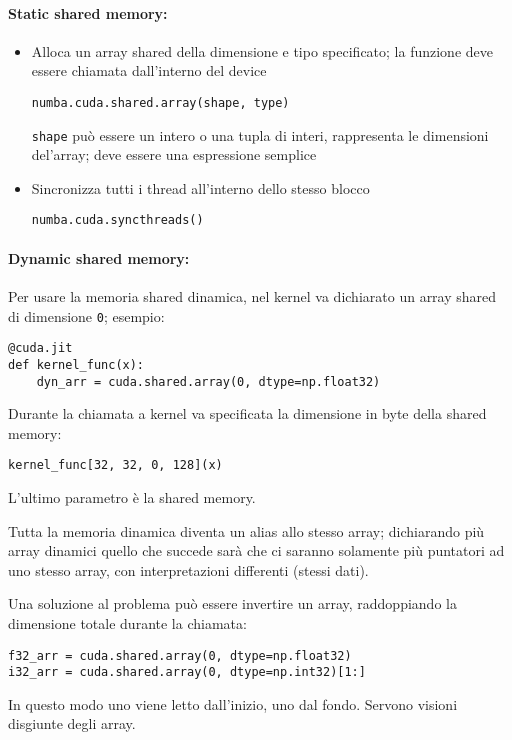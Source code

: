 \paragraph{Static shared memory:}
\begin{itemize}
	\item Alloca un array shared della dimensione e tipo specificato; la funzione deve essere chiamata dall'interno del device
	\begin{verbatim}
numba.cuda.shared.array(shape, type)
	\end{verbatim}
	\texttt{shape} può essere un intero o una tupla di interi, rappresenta le dimensioni del'array; deve essere una espressione semplice
	
	\item Sincronizza tutti i thread all'interno dello stesso blocco
	\begin{verbatim}
numba.cuda.syncthreads()
	\end{verbatim}
\end{itemize} 

\paragraph{Dynamic shared memory:} Per usare la memoria shared dinamica, nel kernel va dichiarato un array shared di dimensione \texttt{0}; esempio:
\begin{verbatim}
@cuda.jit
def kernel_func(x):
	dyn_arr = cuda.shared.array(0, dtype=np.float32)
\end{verbatim}

Durante la chiamata a kernel va specificata la dimensione in byte della shared memory:
\begin{verbatim}
kernel_func[32, 32, 0, 128](x)
\end{verbatim}
L'ultimo parametro è la shared memory.

Tutta la memoria dinamica diventa un alias allo stesso array; dichiarando più array dinamici quello che succede sarà che ci saranno solamente più puntatori ad uno stesso array, con interpretazioni differenti (stessi dati).

Una soluzione al problema può essere invertire un array, raddoppiando la dimensione totale durante la chiamata:
\begin{verbatim}
f32_arr = cuda.shared.array(0, dtype=np.float32)
i32_arr = cuda.shared.array(0, dtype=np.int32)[1:]
\end{verbatim}

In questo modo uno viene letto dall'inizio, uno dal fondo. Servono visioni disgiunte degli array.

